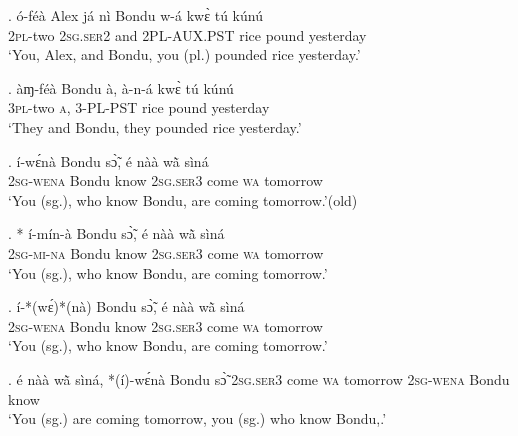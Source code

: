 \documentclass{assets/fieldnotes}
\begin{document}

\exg. ó-féà Alex já nì Bondu w-á kwɛ̀ tú kúnú\\
\textsc{2pl}-two {} \textsc{2sg.ser2} and {} \textsc{2PL-AUX.PST} rice pound yesterday\\
`You, Alex, and Bondu, you (pl.) pounded rice yesterday.’\label{you_alex_bondu}


\exg. àɱ-féà Bondu à, à-n-á kwɛ̀ tú kúnú\\
\textsc{3pl}-two {} \textsc{a}, \textsc{3-PL-PST} rice pound yesterday\\
`They and Bondu, they pounded rice yesterday.’\\


\exg. í-wɛ́nà Bondu sɔ̃̀, é nàà wã̀ sìná\\
\textsc{2sg}-\textsc{wena} Bondu know \textsc{2sg.ser3} come \textsc{wa} tomorrow\\
`You (sg.), who know Bondu, are coming tomorrow.’\hfill{(old)}

\exg. * í-mín-à Bondu sɔ̃̀, é nàà wã̀ sìná\\
\textsc{2sg}-\textsc{mi-na} Bondu know \textsc{2sg.ser3} come \textsc{wa} tomorrow\\
`You (sg.), who know Bondu, are coming tomorrow.’\\

\exg. í-*(wɛ́)*(nà) Bondu sɔ̃̀, é nàà wã̀ sìná\\
\textsc{2sg}-\textsc{wena} Bondu know \textsc{2sg.ser3} come \textsc{wa} tomorrow\\
`You (sg.), who know Bondu, are coming tomorrow.’\\

\exg. é nàà wã̀ sìná, *(í)-wɛ́nà Bondu sɔ̃̀ 
\textsc{2sg.ser3} come \textsc{wa} tomorrow \textsc{2sg}-\textsc{wena} Bondu know \\
`You (sg.) are coming tomorrow, you (sg.) who know Bondu,.’
\end{document}
